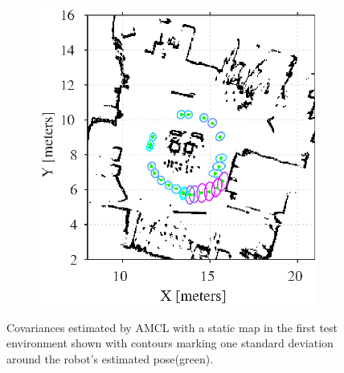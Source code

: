 \begin{figure}[htbp]
	\centering
	\begin{subfigure}[t]{0.55\textwidth}
		\includegraphics[scale=1.0]{chapters/evaluation/figures/localization_static_map1}		
	\end{subfigure}
	\begin{subfigure}[t]{0.2\textwidth}
	\end{subfigure}
	\caption{Covariances estimated by AMCL with a static map in the first test environment shown with contours marking one standard deviation around the robot's estimated pose(green).}
    \label{fig:amcl_covariance_static1}
\end{figure}

